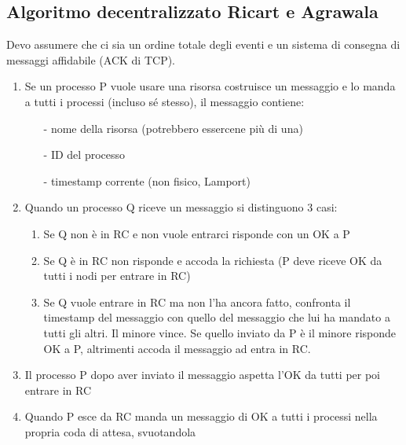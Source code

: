 \documentclass[12pt,italian]{report}
\begin{document}
\subsection{Algoritmo decentralizzato Ricart e Agrawala}
Devo assumere che ci sia un ordine totale degli eventi e un sistema di consegna di messaggi affidabile (ACK di TCP). 
\bigbreak 
\begin{enumerate}
    \item Se un processo P vuole usare una risorsa costruisce un messaggio e lo manda a tutti i processi (incluso sé stesso), il messaggio contiene:
    \begin{itemize}
        \item[-] nome della risorsa (potrebbero essercene più di una)
        \item[-] ID del processo
        \item[-] timestamp corrente (non fisico, Lamport)
    \end{itemize}
    \item Quando un processo Q riceve un messaggio si distinguono 3 casi:
    \begin{enumerate}
        \item Se Q non è in RC e non vuole entrarci risponde con un OK a P
        \item Se Q è in RC non risponde e accoda la richiesta (P deve riceve OK da tutti i nodi per entrare in RC)
        \item Se Q vuole entrare in RC ma non l'ha ancora fatto, confronta il timestamp del messaggio con quello del messaggio che lui ha mandato a tutti gli altri. Il minore vince. Se quello inviato da P è il minore risponde OK a P, altrimenti accoda il messaggio ad entra in RC.
    \end{enumerate}
    \item Il processo P dopo aver inviato il messaggio aspetta l'OK da tutti per poi entrare in RC
    \item Quando P esce da RC manda un messaggio di OK a tutti i processi nella propria coda di attesa, svuotandola
\end{enumerate}
\end{document}

